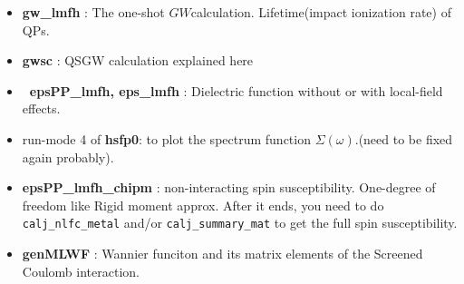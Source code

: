\documentclass[a4paper,10pt,epsf,fleqn]{article}
\newcommand{\GW}{$GW$}
\begin{document}
{\begin{itemize}
\item
{\bf gw\_lmfh} : The one-shot \GW calculation. 
     Lifetime(impact ionization rate) of QPs.

\item
{\bf gwsc} : QSGW calculation explained here

\item
{\bf \ epsPP\_lmfh, eps\_lmfh} : Dielectric function without or with local-field effects.

\item
 run-mode 4 of {\bf hsfp0}: to plot the spectrum function
     $\Sigma(\omega)$.(need to be fixed again probably). 


\item
{\bf epsPP\_lmfh\_chipm} : non-interacting spin susceptibility. 
One-degree of freedom like Rigid moment approx.
After it ends, you need to do \verb#calj_nlfc_metal# and/or \verb#calj_summary_mat#
to get the full spin susceptibility.

\item
{\bf genMLWF} : Wannier funciton and its matrix elements of the Screened
     Coulomb interaction.

\end{itemize}








}
\end{document}
